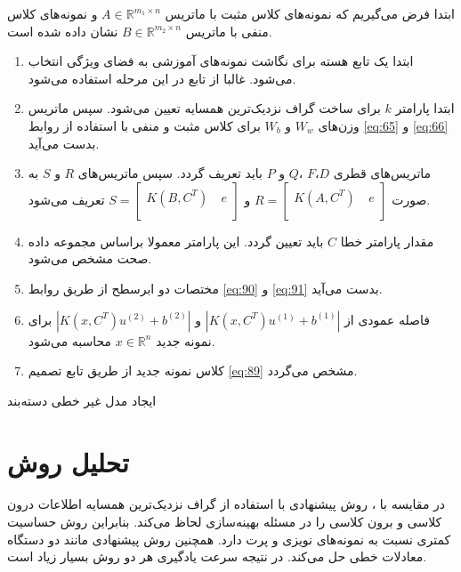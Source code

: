 \begin{algorithm}[!t]
\begin{steps}
	
	ابتدا فرض می‌گیریم که نمونه‌های کلاس مثبت با ماتریس  $A\in {{\mathbb{R}}^{{{m}_{1}}\times n}}$ و نمونه‌های کلاس منفی با ماتریس  $B\in {{\mathbb{R}}^{{{m}_{2}}\times n}}$ نشان داده شده است.
	
	\begin{enumerate}
		\item ابتدا یک تابع هسته برای نگاشت نمونه‌های آموزشی به فضای ویژگی انتخاب می‌شود. غالبا از تابع  در این مرحله استفاده می‌شود.
		\item ابتدا پارامتر  $k$ برای ساخت گراف نزدیک‌ترین همسایه تعیین می‌شود. سپس ماتریس وزن‌های  $W_{w}$ و   $W_{b}$ برای کلاس مثبت و منفی با استفاده از روابط \ref{eq:65} و \ref{eq:66} بدست می‌آید.
		\item ماتریس‌های قطری  $D$،$F$ ،$Q$  و $P$ باید تعریف گردد. سپس ماتریس‌های $R$ و  $S$ به صورت  $R=\left[ \begin{matrix} K(A,{{C}^{T}})\ & e  \\ \end{matrix} \right]$  و $S=\left[ \begin{matrix} K(B,{{C}^{T}})\ & e  \\ \end{matrix} \right]$  تعریف می‌شود.
		\item مقدار پارامتر خطا $C$ باید تعیین گردد. این پارامتر معمولا براساس مجموعه داده صحت  مشخص می‌شود.
		\item مختصات دو ابرسطح از طریق روابط \ref{eq:90} و \ref{eq:91} بدست می‌آید.
		\item فاصله عمودی از $|K(x,{C}^{T}){{u}^{(1)}}+{{b}^{(1)}}|$ و  $|K(x,{C}^{T}){{u}^{(2)}}+{{b}^{(2)}}|$ برای نمونه جدید  $x \in \mathbb{R}^{n}$ محاسبه می‌شود.
		\item کلاس نمونه جدید از طریق تابع تصمیم \ref{eq:89} مشخص می‌گردد.
	\end{enumerate}
\caption{ ایجاد مدل غیر خطی دسته‌بند }
\label{Algo:Non-Linear-KNN-LSTSVM}
\end{steps}
\end{algorithm}

\newpage
\section{تحلیل روش }\label{sec:3:4}
در مقایسه با ، روش پیشنهادی با استفاده از گراف نزدیک‌ترین همسایه اطلاعات درون کلاسی و برون کلاسی را در مسئله بهینه‌سازی لحاظ می‌کند. بنابراین روش  حساسیت کمتری نسبت به نمونه‌های نویزی و پرت دارد. همچنین روش پیشنهادی مانند  دو دستگاه معادلات خطی حل می‌کند. در نتیجه سرعت یادگیری هر دو روش بسیار زیاد است.

